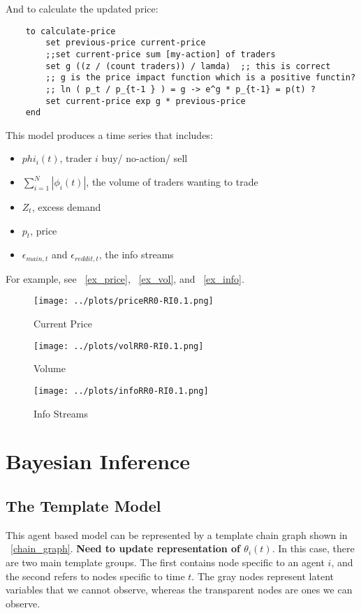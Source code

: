 \documentclass[a4paper, 11pt]{report}
\begin{document}
	And to calculate the updated price:
	\begin{lstlisting}
	to calculate-price
		set previous-price current-price
		;;set current-price sum [my-action] of traders
		set g ((z / (count traders)) / lamda)  ;; this is correct
		;; g is the price impact function which is a positive functin?
		;; ln ( p_t / p_{t-1 } ) = g -> e^g * p_{t-1} = p(t) ?
		set current-price exp g * previous-price
	end
	\end{lstlisting}
	
	This model produces a time series that includes:
	\begin{itemize}
		\item $phi_{i}(t)$, trader $i$ buy/ no-action/ sell
		\item $\sum_{i=1}^{N} | \phi_{i}(t) |$, the volume of traders wanting to trade
		\item $Z_{t}$, excess demand
		\item $p_{t}$, price
		\item $\epsilon_{main,t}$ and $\epsilon_{reddit,t}$, the info streams
	\end{itemize}

	For example, see ~\autoref{ex_price}, ~\autoref{ex_vol}, and ~\autoref{ex_info}.
\begin{figure}[h!]
	\caption{Current Price}
	\label{ex_price}
	\texttt{[image: ../plots/priceRR0-RI0.1.png]}
\end{figure}

\begin{figure}[h!]
	\caption{Volume}
	\label{ex_vol}
	\texttt{[image: ../plots/volRR0-RI0.1.png]}
\end{figure}

\begin{figure}[h!]
	\caption{Info Streams}
	\label{ex_info}
	\texttt{[image: ../plots/infoRR0-RI0.1.png]}
\end{figure}

\chapter{Bayesian Inference}	
\section{The Template Model}
This agent based model can be represented by a template chain graph shown in ~\autoref{chain_graph}. \textbf{Need to update representation of $\theta_{i}(t)$}. In this case, there are two main template groups. The first contains node specific to an agent $i$, and the second refers to nodes specific to time $t$. The gray nodes represent latent variables that we cannot observe, whereas the transparent nodes are ones we can observe. 
\end{document}
